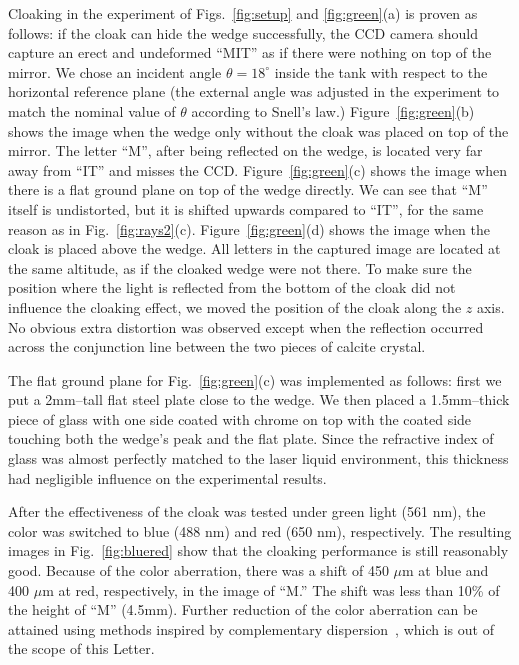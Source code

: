\documentclass[preprint,preprintnumbers,amsmath,amssymb]{revtex4}
\begin{document}
Cloaking in the experiment of Figs.~\ref{fig:setup} and
\ref{fig:green}(a) is proven as follows: if the cloak can hide the
wedge successfully, the CCD camera should capture an erect and
undeformed ``MIT'' as if there were nothing on top of the mirror. We
chose an incident angle $\theta = 18^{\circ}$ inside the tank with
respect to the horizontal reference plane (the external angle was
adjusted in the experiment to match the nominal value of $\theta$
according to Snell's law.) Figure~\ref{fig:green}(b) shows the image
when the wedge only without the cloak was placed on top of the
mirror. The letter ``M'', after being reflected on the wedge, is
located very far away from ``IT'' and misses the CCD.
Figure~\ref{fig:green}(c) shows the image when there is a flat
ground plane on top of the wedge directly. We can see that ``M''
itself is undistorted, but it is shifted upwards compared to ``IT'',
for the same reason as in Fig.~\ref{fig:rays2}(c).
Figure~\ref{fig:green}(d) shows the image when the cloak is placed
above the wedge. All letters in the captured image are located at
the same altitude, as if the cloaked wedge were not there. To make
sure the position where the light is reflected from the bottom of
the cloak did not influence the cloaking effect, we moved the
position of the cloak along the $z$ axis. No obvious extra
distortion was observed except when the reflection occurred across
the conjunction line between the two pieces of calcite crystal.

The flat ground plane for Fig.~\ref{fig:green}(c) was implemented as
follows: first we put a 2mm--tall flat steel plate close to the
wedge. We then placed a 1.5mm--thick piece of glass with one side
coated with chrome on top with the coated side touching both the
wedge's peak and the flat plate. Since the refractive index of glass
was almost perfectly matched to the laser liquid environment, this
thickness had negligible influence on the experimental results.

After the effectiveness of the cloak was tested under green light
(561 nm), the color was switched to blue (488 nm) and red (650 nm),
respectively. The resulting images in Fig.~\ref{fig:bluered} show
that the cloaking performance is still reasonably good. Because of
the color aberration, there was a shift of 450 $\mu$m at blue and
400 $\mu$m at red, respectively, in the image of ``M.'' The shift
was less than 10\% of the height of ``M'' (4.5mm). Further reduction
of the color aberration can be attained using methods inspired by
complementary dispersion~\cite{lensabberation}, which is out of the
scope of this Letter.
\end{document}
